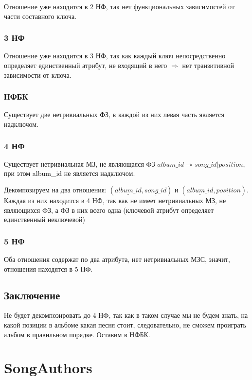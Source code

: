 \documentclass{article}
\begin{document}
Отношение уже находится в 2 НФ, так нет функциональных зависимостей от части составного ключа.

\subsubsection{3 НФ}

Отношение уже находится в 3 НФ, так как каждый ключ непосредственно определяет единственный атрибут, не входящий в него $\Rightarrow$ нет транзитивной зависимости от ключа.

\subsubsection{НФБК}

Существует две нетривиальных ФЗ, в каждой из них левая часть является надключом.

\subsubsection{4 НФ}

Существует нетривиальная МЗ, не являющаяся ФЗ $album\_id \twoheadrightarrow song\_id | position$, при этом album\_id не является надключом.

Декомпозируем на два отношения: $(\underline{album\_id}, \underline{song\_id})$ и $(\underline{album\_id}, \underline{position})$. Каждая из них находится в 4 НФ, так как не имеет нетривиальных МЗ, не являющихся ФЗ, а ФЗ в них всего одна (ключевой атрибут определяет единственный неключевой)

\subsubsection{5 НФ}
Оба отношения содержат по два атрибута, нет нетривиальных МЗС, значит, отношения находятся в 5 НФ.

\subsection{Заключение}
Не будет декомпозировать до 4 НФ, так как в таком случае мы не будем знать, на какой позиции в альбоме какая песня стоит, следовательно, не сможем проиграть альбом в правильном порядке. Оставим в НФБК.

\section{SongAuthors}
\end{document}
